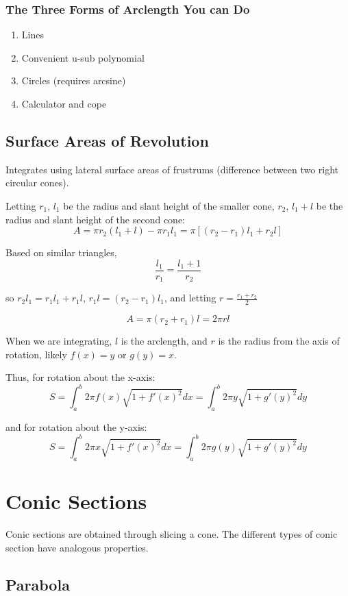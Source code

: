 \documentclass{article}
\begin{document}
\subsubsection{The Three Forms of Arclength You can Do}
\begin{enumerate}
    \item Lines
    \item Convenient u-sub polynomial
    \item Circles (requires arcsine)
    \item Calculator and cope
\end{enumerate}

\subsection{Surface Areas of Revolution}
Integrates using lateral surface areas of frustrums (difference between two right circular cones).

Letting $r_1$, $l_1$ be the radius and slant height of the smaller cone, $r_2$, $l_1 + l$ be the radius and slant height of the second cone:
$$A = \pi r_2(l_1 + l) - \pi r_1 l_1 = \pi[(r_2 - r_1)l_1 + r_2l]$$

Based on similar triangles,
$$\frac{l_1}{r_1} = \frac{l_1 + 1}{r_2}$$

so $r_2 l_1 = r_1 l_1 + r_1 l$, $r_1 l = (r_2 - r_1)l_1$, and letting $r = \frac{r_1 + r_2}{2}$

$$A = \pi (r_2 + r_1)l = 2 \pi r l$$

When we are integrating, $l$ is the arclength, and $r$ is the radius from the axis of rotation, likely $f(x) = y$ or $g(y) = x$.

Thus, for rotation about the x-axis:
$$S = \int_{a}^{b} 2 \pi f(x) \sqrt{1 + f'(x)^2} dx = \int_{a}^{b} 2 \pi y \sqrt{1 + g'(y)^2} dy$$

and for rotation about the y-axis:
$$S = \int_{a}^{b} 2 \pi x \sqrt{1 + f'(x)^2} dx = \int_{a}^{b} 2 \pi g(y) \sqrt{1 + g'(y)^2} dy$$


\section{Conic Sections}
Conic sections are obtained through slicing a cone. The different types of conic section have analogous properties.

\subsection{Parabola}
\end{document}
